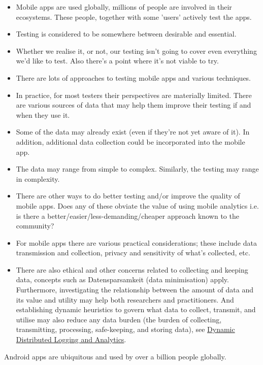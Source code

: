 \begin{itemize}
    \item Mobile apps are used globally, millions of people are involved in their ecosystems. These people, together with some 'users' actively test the apps.
    \item Testing is considered to be somewhere between desirable and essential. 
    \item Whether we realise it, or not, our testing isn't going to cover even everything we'd like to test. Also there's a point where it's not viable to try. 
    \item There are lots of approaches to testing mobile apps and various techniques.
    \item In practice, for most testers their perspectives are materially limited. There are various sources of data that may help them improve their testing if and when they use it. 
    \item Some of the data may already exist (even if they're not yet aware of it). In addition, additional data collection could be incorporated into the mobile app.
    \item The data may range from simple to complex. Similarly, the testing may range in complexity.
    \item There are other ways to do better testing and/or improve the quality of mobile apps. Does any of these obviate the value of using mobile analytics i.e. is there a better/easier/less-demanding/cheaper approach known to the community? 
    \item For mobile apps there are various practical considerations; these include data transmission and collection, privacy and sensitivity of what's collected, etc.
    \item There are also ethical and other concerns related to collecting and keeping data, concepts such as Datensparsamkeit\cite{fowler_datensparsamkeit_2013} (data minimisation) apply. Furthermore, investigating the relationship between the amount of data and its value and utility may help both researchers and practitioners. And establishing dynamic heuristics to govern what data to collect, transmit, and utilise may also reduce any data burden (the burden of collecting, transmitting, processing, safe-keeping, and storing data), see \hyperlink{dynamiclogging}{Dynamic Distributed Logging and Analytics}.
\end{itemize}

Android apps are ubiquitous and used by over a billion people globally.

